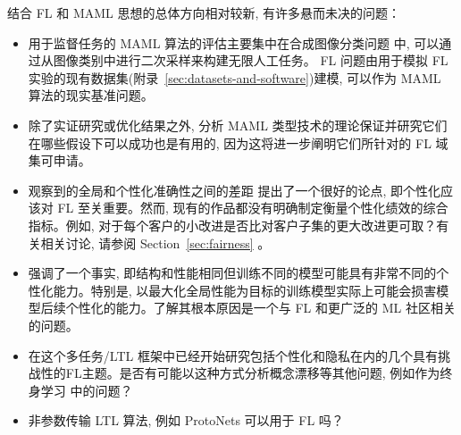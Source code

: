 结合 FL 和 MAML 思想的总体方向相对较新, 有许多悬而未决的问题：
\begin{itemize}
\item 用于监督任务的 MAML 算法的评估主要集中在合成图像分类问题 \citep{lake11omniglot,ravi17miniimagenet} 中, 可以通过从图像类别中进行二次采样来构建无限人工任务。 FL 问题由用于模拟 FL 实验的现有数据集(附录~\ref{sec:datasets-and-software})建模, 可以作为 MAML 算法的现实基准问题。
\item 除了实证研究或优化结果之外, 分析 MAML 类型技术的理论保证并研究它们在哪些假设下可以成功也是有用的, 因为这将进一步阐明它们所针对的 FL 域集可申请。
\item 观察到的全局和个性化准确性之间的差距 \citep{jiang2019improving} 提出了一个很好的论点, 即个性化应该对 FL 至关重要。然而, 现有的作品都没有明确制定衡量个性化绩效的综合指标。例如, 对于每个客户的小改进是否比对客户子集的更大改进更可取？有关相关讨论, 请参阅 Section~\ref{sec:fairness} 。
\item \citet{jiang2019improving} 强调了一个事实, 即结构和性能相同但训练不同的模型可能具有非常不同的个性化能力。特别是, 以最大化全局性能为目标的训练模型实际上可能会损害模型后续个性化的能力。了解其根本原因是一个与 FL 和更广泛的 ML 社区相关的问题。
\item 在这个多任务/LTL 框架\cite{khodak19adaptive,jiang2019improving,li19dpmeta}中已经开始研究包括个性化和隐私在内的几个具有挑战性的FL主题。是否有可能以这种方式分析概念漂移等其他问题, 例如作为终身学习\citep{silver13lifelong} 中的问题？
\item 非参数传输 LTL 算法, 例如 ProtoNets \citep{snell17protonets} 可以用于 FL 吗？
\end{itemize}

\newcommand{\hFL}{h_{\text{FL}}}
